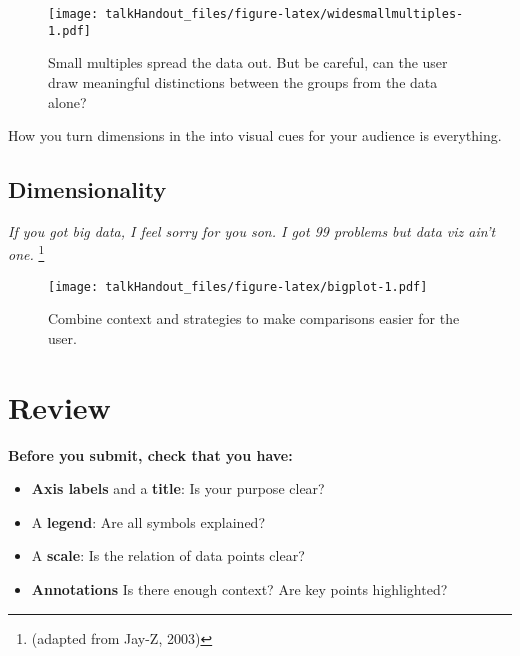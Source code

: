 \documentclass{tufte-handout}
\begin{document}
\begin{figure*}
 \texttt{[image: talkHandout\_files/figure-latex/widesmallmultiples-1.pdf]}
\caption{Small multiples spread the data out. But be careful, can the user draw meaningful distinctions between the groups from the data alone?}
\end{figure*}

How you turn dimensions in the into visual cues for your audience is
everything.

\subsection{Dimensionality}\label{dimensionality}

\emph{If you got big data, I feel sorry for you son. I got 99 problems
but data viz ain't one.} \footnote{(adapted from Jay-Z, 2003)}

\begin{figure*}
 \texttt{[image: talkHandout\_files/figure-latex/bigplot-1.pdf]}
\caption{Combine context and strategies to make comparisons easier for the user.}
\end{figure*}


\section{Review}\label{review}

\textbf{Before you submit, check that you have:}

\begin{itemize}
\itemsep1pt\parskip0pt
\item
  \textbf{Axis labels} and a \textbf{title}: Is your purpose clear?
\item
  A \textbf{legend}: Are all symbols explained?
\item
  A \textbf{scale}: Is the relation of data points clear?
\item
  \textbf{Annotations} Is there enough context? Are key points
  highlighted?
\end{itemize}
\end{document}
